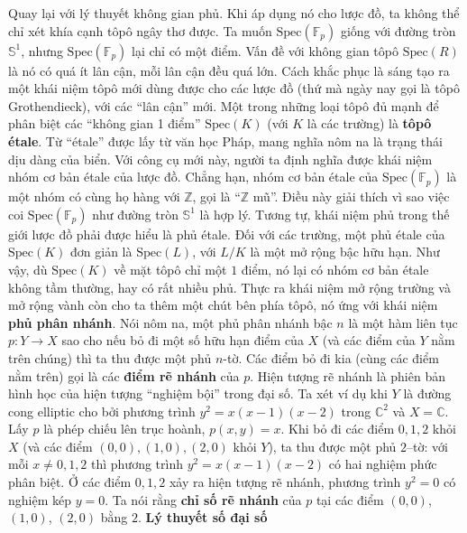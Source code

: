 \begin{multicols}{2}
	\vskip 0.1cm
	Quay lại với lý thuyết không gian phủ. Khi áp dụng nó cho lược đồ, ta không thể chỉ xét khía cạnh tôpô ngây thơ được. Ta muốn $\text{Spec}(\mathbb{F}_p)$ giống với đường tròn $\mathbb{S}^1$, nhưng $\text{Spec}(\mathbb{F}_p)$ lại chỉ có một điểm. Vấn đề với không gian tôpô $\text{Spec}(R)$ là nó có quá ít lân cận, mỗi lân cận đều quá lớn. Cách khắc phục là sáng tạo ra một khái niệm tôpô mới dùng được cho các lược đồ (thứ mà ngày nay gọi là tôpô Grothendieck), với các ``lân cận'' mới. Một trong những loại tôpô đủ mạnh để phân biệt các ``không gian 1 điểm'' $\text{Spec}(K)$ (với $K$ là các trường) là {\bf\color{duongvaotoanhoc} tôpô étale}. Từ ``étale'' được lấy từ văn học Pháp, mang nghĩa nôm na là trạng thái dịu dàng của biển. Với công cụ mới này, người ta định nghĩa được khái niệm nhóm cơ bản étale của lược đồ. Chẳng hạn, nhóm cơ bản étale của $\text{Spec}(\mathbb{F}_p)$ là một nhóm có cùng họ hàng với $\mathbb{Z}$, gọi là ``$\mathbb{Z}$ mũ''. Điều này giải thích vì sao việc coi $\text{Spec}(\mathbb{F}_p)$ như đường tròn $\mathbb{S}^1$ là hợp lý. Tương tự, khái niệm phủ trong thế giới lược đồ phải được hiểu là phủ étale. Đối với các trường, một phủ étale của $\text{Spec}(K)$ đơn giản là $\text{Spec}(L)$, với $L/K$ là một mở rộng bậc hữu hạn. Như vậy, dù $\text{Spec}(K)$ về mặt tôpô chỉ một $1$ điểm, nó lại có nhóm cơ bản étale không tầm thường, hay có rất nhiều phủ. 
	\vskip 0.1cm
	Thực ra khái niệm mở rộng trường và mở rộng vành còn cho ta thêm một chút bên phía tôpô, nó ứng với khái niệm {\bf\color{duongvaotoanhoc} phủ phân nhánh}. Nói nôm na, một phủ phân nhánh bậc $n$ là một hàm liên tục $p: Y \to X$ sao cho nếu bỏ đi một số hữu hạn điểm của $X$ (và các điểm của $Y$ nằm trên chúng) thì ta thu được một phủ $n$-tờ. Các điểm bỏ đi kia (cùng các điểm nằm trên) gọi là các {\bf\color{duongvaotoanhoc} điểm rẽ nhánh} của $p$. Hiện tượng rẽ nhánh là phiên bản hình học của hiện tượng ``nghiệm bội'' trong đại số. Ta xét ví dụ khi $Y$ là đường cong elliptic cho bởi phương trình $y^2=x(x-1)(x-2)$ trong $\mathbb{C}^2$ và $X = \mathbb{C}$. Lấy $p$ là phép chiếu lên trục hoành, $p(x,y) = x$. Khi bỏ đi các điểm $0, 1, 2$ khỏi $X$ (và các điểm $(0,0), (1,0), (2,0)$ khỏi $Y$), ta thu được một phủ $2$--tờ: với mỗi $x \neq 0,1,2$ thì phương trình $y^2=x(x-1)(x-2)$ có hai nghiệm phức phân biệt. Ở các điểm $0, 1, 2$ xảy ra hiện tượng rẽ nhánh, phương trình $y^2=0$ có nghiệm kép $y=0$. Ta nói rằng {\bf\color{duongvaotoanhoc} chỉ số rẽ nhánh} của $p$ tại các điểm $(0,0)$, $(1,0)$, $(2,0)$ bằng $2$.
	\vskip 0.1cm
	\textbf{\color{duongvaotoanhoc}Lý thuyết số đại số}

\end{multicols}
